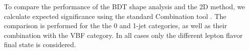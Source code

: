 To compare the performance of the BDT shape analysis and the 2D method,
we calculate expected significance using the standard Combination tool \cite{combine}. 
The comparison is performed for the the 0 and 1-jet categories, as well
as their combination with the VBF category. 
In all cases only the different lepton flavor
final state is considered.

